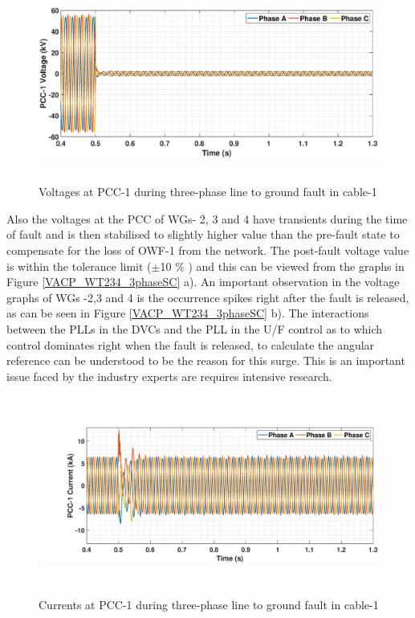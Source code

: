 \begin{figure}[H]
\centering
    \includegraphics[height = 6.5cm,width = 17.5cm]{Diagrams/Chapter_5/VABC_WT1_3phaseSC.eps}
    \caption{Voltages at PCC-1 during three-phase line to ground fault in cable-1}
    \label{VABC_WT1_3phaseSC}
\end{figure}

Also the voltages at the \gls{PCC} of \gls{WG}s- 2, 3 and 4 have transients during the time of fault and is then stabilised to slightly higher value than the pre-fault state to compensate for the loss of \gls{OWF}-1 from the network. The post-fault voltage value is within the tolerance limit ($\pm$10 \% ) and this can be viewed from the graphs in Figure \ref{VACP_WT234_3phaseSC} a). An important observation in the voltage graphs of \gls{WG}s -2,3 and 4 is the occurrence spikes right after the fault is released, as can be seen in Figure \ref{VACP_WT234_3phaseSC} b). The interactions between the \gls{PLL}s in the \gls{DVC}s and the \gls{PLL} in the U/F control as to which control dominates right when the fault is released, to calculate the angular reference can be understood to be the reason for this surge. This is an important issue faced by the industry experts are requires intensive research.

\begin{figure}[H]
\centering
    \includegraphics[height = 6.5cm,width = 17.5cm]{Diagrams/Chapter_5/IABC_WT1_3phaseSC.eps}
    \caption{Currents at PCC-1 during three-phase line to ground fault in cable-1}
    \label{WT1_currents_3phasefault}
\end{figure}


